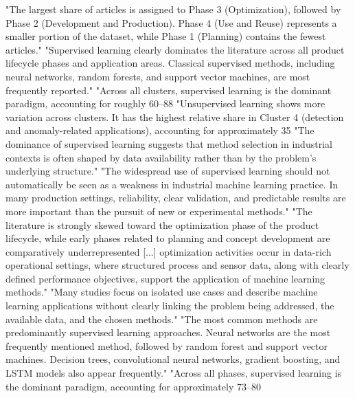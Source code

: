 "The largest share of articles is assigned to Phase 3 (Optimization), followed by Phase 2 (Development and Production). Phase 4 (Use and Reuse) represents a smaller portion of the dataset, while Phase 1 (Planning) contains the fewest articles."
"Supervised learning clearly dominates the literature across all product lifecycle phases and application areas. Classical supervised methods, including neural networks, random forests, and support vector machines, are most frequently reported."
"Across all clusters, supervised learning is the dominant paradigm, accounting for roughly 60–88%
"Unsupervised learning shows more variation across clusters. It has the highest relative share in Cluster 4 (detection and anomaly-related applications), accounting for approximately 35%
"The dominance of supervised learning suggests that method selection in industrial contexts is often shaped by data availability rather than by the problem's underlying structure."
"The widespread use of supervised learning should not automatically be seen as a weakness in industrial machine learning practice. In many production settings, reliability, clear validation, and predictable results are more important than the pursuit of new or experimental methods."
"The literature is strongly skewed toward the optimization phase of the product lifecycle, while early phases related to planning and concept development are comparatively underrepresented [...] optimization activities occur in data-rich operational settings, where structured process and sensor data, along with clearly defined performance objectives, support the application of machine learning methods."
"Many studies focus on isolated use cases and describe machine learning applications without clearly linking the problem being addressed, the available data, and the chosen methods."
"The most common methods are predominantly supervised learning approaches. Neural networks are the most frequently mentioned method, followed by random forest and support vector machines. Decision trees, convolutional neural networks, gradient boosting, and LSTM models also appear frequently."
"Across all phases, supervised learning is the dominant paradigm, accounting for approximately 73–80%
